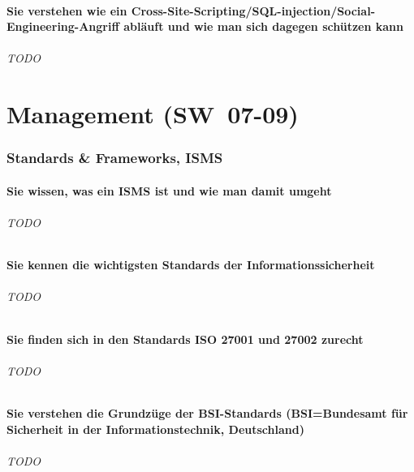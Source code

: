 \documentclass[10pt,a4paper]{article}
\begin{document}
\subsection*{Sie verstehen wie ein Cross-Site-Scripting/SQL-injection/Social-Engineering-Angriff abläuft und wie man sich dagegen schützen kann}
\paragraph*{TODO}

\part{Management (SW~07-09)}
\section{Standards \& Frameworks, ISMS}
\subsection*{Sie wissen, was ein ISMS ist und wie man damit umgeht}
\paragraph*{TODO}
\subsection*{Sie kennen die wichtigsten Standards der Informationssicherheit}
\paragraph*{TODO}
\subsection*{Sie finden sich in den Standards ISO 27001 und 27002 zurecht}
\paragraph*{TODO}
\subsection*{Sie verstehen die Grundzüge der BSI-Standards (BSI=Bundesamt für Sicherheit in der Informationstechnik, Deutschland)}
\paragraph*{TODO}
\end{document}
